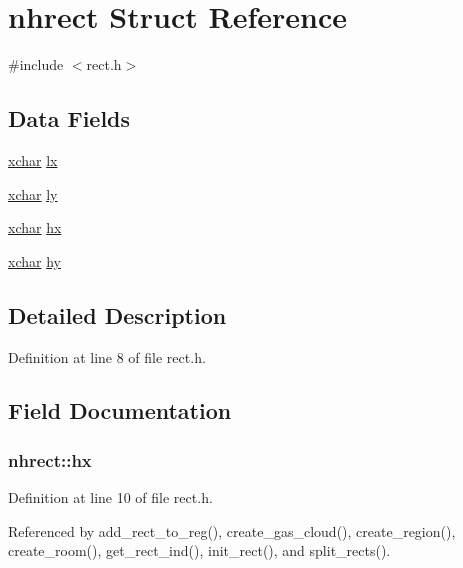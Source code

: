 \hypertarget{structnhrect}{\section{nhrect Struct Reference}
\label{structnhrect}
}


{\ttfamily \#include $<$rect.\+h$>$}

\subsection*{Data Fields}
\begin{DoxyCompactItemize}
\item 
\hyperlink{global_8h_a2043b7d01ce89f4ee2fa6c345a752d32}{xchar} \hyperlink{structnhrect_acfb56c33a9fd34960bb7b86f8470cdcf}{lx}
\item 
\hyperlink{global_8h_a2043b7d01ce89f4ee2fa6c345a752d32}{xchar} \hyperlink{structnhrect_ab036ec40a3e9eea9628acfd47c94a181}{ly}
\item 
\hyperlink{global_8h_a2043b7d01ce89f4ee2fa6c345a752d32}{xchar} \hyperlink{structnhrect_a42e30acf0258a3280d0e7d39384c235d}{hx}
\item 
\hyperlink{global_8h_a2043b7d01ce89f4ee2fa6c345a752d32}{xchar} \hyperlink{structnhrect_a9b42981eb9df1a1b9e37a79e07b1de5e}{hy}
\end{DoxyCompactItemize}


\subsection{Detailed Description}


Definition at line 8 of file rect.\+h.



\subsection{Field Documentation}
\hypertarget{structnhrect_a42e30acf0258a3280d0e7d39384c235d}{
\subsubsection[{hx}]{ nhrect\+::hx}}\label{structnhrect_a42e30acf0258a3280d0e7d39384c235d}


Definition at line 10 of file rect.\+h.



Referenced by add\+\_\+rect\+\_\+to\+\_\+reg(), create\+\_\+gas\+\_\+cloud(), create\+\_\+region(), create\+\_\+room(), get\+\_\+rect\+\_\+ind(), init\+\_\+rect(), and split\+\_\+rects().

